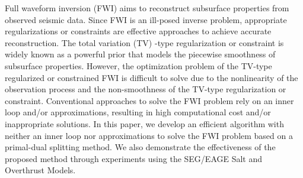 \begin{summary}
Full waveform inversion (FWI) aims to reconstruct subsurface properties from observed seismic data.
Since FWI is an ill-posed inverse problem, appropriate regularizations or constraints are effective approaches to achieve accurate reconstruction.
The total variation (TV) -type regularization or constraint is widely known as a powerful prior that models the piecewise smoothness of subsurface properties.
However, the optimization problem of the TV-type regularized or constrained FWI is difficult to solve due to the nonlinearity of the observation process and the non-smoothness of the TV-type regularization or constraint.
Conventional approaches to solve the FWI problem rely on an inner loop and/or approximations, resulting in high computational cost and/or inappropriate solutions.
In this paper, we develop an efficient algorithm with neither an inner loop nor approximations to solve the FWI problem based on a primal-dual splitting method.
We also demonstrate the effectiveness of the proposed method through experiments using the SEG/EAGE Salt and Overthrust Models.
\end{summary}
